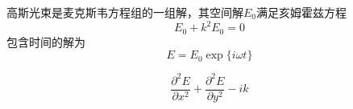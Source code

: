 

高斯光束是麦克斯韦方程组的一组解，其空间解$E_0$满足亥姆霍兹方程
\begin{equation}
E_0 + k^2E_0=0
\end{equation}
包含时间的解为
\begin{equation}
E=E_0\exp\{i\omega t\}
\end{equation}

\begin{equation}
\frac{\partial^2 E}{\partial x^2} +\frac{\partial^2 E}{\partial y^2} -ik 
\end{equation}
